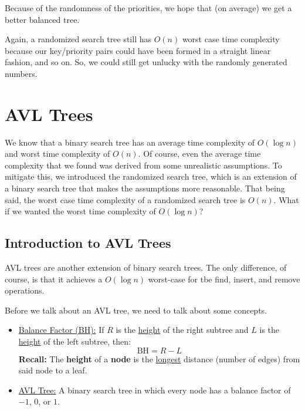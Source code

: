 \documentclass[letterpaper]{article}
\begin{document}
\bigskip 

Because of the randomness of the priorities, we hope that (on average) we get a better balanced tree. 

\bigskip 

Again, a randomized search tree still has $O(n)$ worst case time complexity because our key/priority pairs could have been formed in a straight linear fashion, and so on. So, we could still get unlucky with the randomly generated numbers. 











\newpage
\section{AVL Trees}
We know that a binary search tree has an average time complexity of $O(\log n)$ and worst time complexity of $O(n)$. Of course, even the average time complexity that we found was derived from some unrealistic assumptions. To mitigate this, we introduced the randomized search tree, which is an extension of a binary search tree that makes the assumptions more reasonable. That being said, the worst case time complexity of a randomized search tree is $O(n)$. What if we wanted the worst time complexity of $O(\log n)$? 

\subsection{Introduction to AVL Trees}
AVL trees are another extension of binary search trees. The only difference, of course, is that it achieves a $O(\log n)$ worst-case for tbe find, insert, and remove operations.

\bigskip 

Before we talk about an AVL tree, we need to talk about some concepts. 
\begin{itemize}
    \item \underline{Balance Factor (BH):} If $R$ is the \underline{height} of the right subtree and $L$ is the \underline{height} of the left subtree, then: 
    \[\text{BH} = R - L\]
    \textbf{Recall:} The \textbf{height} of a \textbf{node} is the \underline{longest} distance (number of edges) from said node to a leaf. 

    \item \underline{AVL Tree:} A binary search tree in which every node has a balance factor of $-1$, $0$, or $1$. 
\end{itemize}
\end{document}
